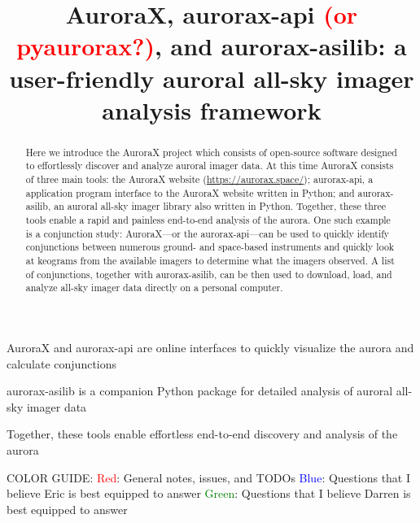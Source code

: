\documentclass[draft]{agujournal2019}
\begin{document}
\title{AuroraX, aurorax-api \textcolor{red}{(or pyaurorax?)}, and aurorax-asilib: a user-friendly auroral all-sky imager analysis framework}





\begin{keypoints}
\item AuroraX and aurorax-api are online interfaces to quickly visualize the aurora and calculate conjunctions
\item aurorax-asilib is a companion Python package for detailed analysis of auroral all-sky imager data 
\item Together, these tools enable effortless end-to-end discovery and analysis of the aurora
\end{keypoints}

COLOR GUIDE: \newline
\textcolor{red}{Red}: General notes, issues, and TODOs \newline
\textcolor{blue}{Blue}: Questions that I believe Eric is best equipped to answer \newline
\textcolor{green}{Green}: Questions that I believe Darren is best equipped to answer

\begin{abstract}
Here we introduce the AuroraX project which consists of open-source software designed to effortlessly discover and analyze auroral imager data. At this time AuroraX consists of three main tools: the AuroraX website (\url{https://aurorax.space/}); aurorax-api, a application program interface to the AuroraX website written in Python; and aurorax-asilib, an auroral all-sky imager library also written in Python. Together, these three tools enable a rapid and painless end-to-end analysis of the aurora. One such example is a conjunction study: AuroraX---or the aurorax-api---can be used to quickly identify conjunctions between numerous ground- and space-based instruments and quickly look at keograms from the available imagers to determine what the imagers observed. A list of conjunctions, together with aurorax-asilib, can be then used to download, load, and analyze all-sky imager data directly on a personal computer.
\end{abstract}
\end{document}
